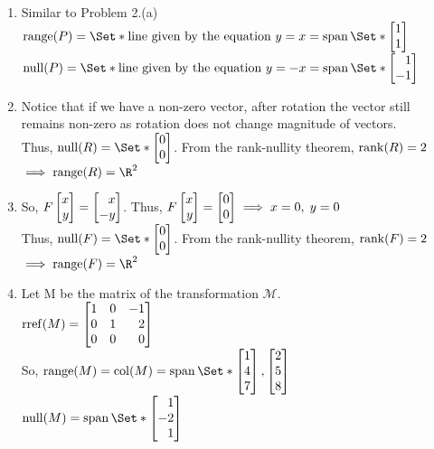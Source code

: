 \begin{exercises}
\begin{problist}
		\begin{solution}
		    \begin{enumerate}
    		    \item Similar to Problem 2.(a)\\
    		    $\Range(P) = \Set*{\text{line given by the equation } y=x} = \Span\Set*{\mat{1\\1}}$\\
    		    $\Null(P) = \Set*{\text{line given by the equation } y=-x} = \Span\Set*{\mat{1\\-1}}$
    		    
    		    \item Notice that if we have a non-zero vector, after rotation the vector still remains non-zero as rotation does not change magnitude of vectors.\\
    		    Thus, $\Null(R)=\Set*{\mat{0\\0}}$. From the rank-nullity theorem, $\operatorname{rank}(R) = 2$\\
    		    $\implies \Range(R) = \R^2$
    		    
    		    \item So, $F\mat{x\\y} = \mat{x\\-y}$. Thus, $F\mat{x\\y} = \mat{0\\0} \implies x=0, \; y=0$\\
    		    Thus, $\Null(F)=\Set*{\mat{0\\0}}$. From the rank-nullity theorem, $\operatorname{rank}(F) = 2$\\
    		    $\implies \Range(F) = \R^2$
    		    
    		    \item Let M be the matrix of the transformation $\mathcal{M}$. \\
    		    $\Rref(M)= \mat{1&0&-1\\0&1&2\\0&0&0}$\\
    		    So, $\Range(M)=\Col(M)=\Span\Set*{\mat{1\\4\\7},\mat{2\\5\\8}}$\\
    		    $\Null(M)=\Span\Set*{\mat{1\\-2\\1}}$
    		    

\end{enumerate}
\end{solution}
\end{problist}
\end{exercises}
